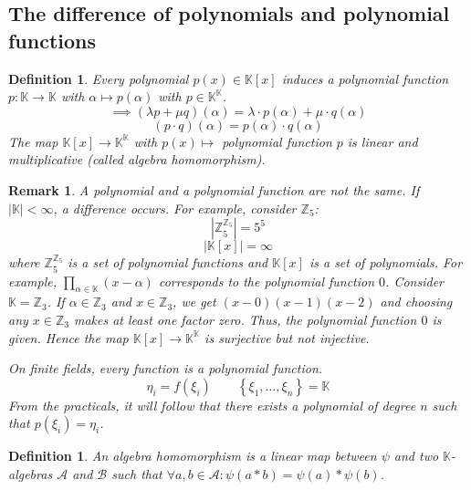 \documentclass{article}
\newcounter{lecref}[section]
\numberwithin{lecref}{section}
\newtheorem{definition}[lecref]{Definition}
\newtheorem{remark}[lecref]{Remark}
\newcommand{\set}[1]{\left\{#1\right\}}
\newcommand{\card}[1]{\left|#1\right|}
\begin{document}
\subsection{The difference of polynomials and polynomial functions}

\begin{definition} %
  Every polynomial $p(x) \in \mathbb K[x]$ induces a polynomial function $p: \mathbb K \to \mathbb K$ with $\alpha \mapsto p(\alpha)$
  with $p \in \mathbb K^{\mathbb K}$.
  \[ \implies (\lambda p + \mu q) (\alpha) = \lambda \cdot p(\alpha) + \mu \cdot q(\alpha) \]
  \[ (p \cdot q)(\alpha) = p(\alpha) \cdot q(\alpha) \]
  The map $\mathbb K[x] \to \mathbb K^{\mathbb K}$ with $p(x) \mapsto$ polynomial function $p$
  is linear and multiplicative (called \emph{algebra homomorphism}).
\end{definition}

\begin{remark} %
  A polynomial and a polynomial function are not the same.
  If $\card{\mathbb K} < \infty$, a difference occurs.
  For example, consider $\mathbb Z_5$:
  \[ \card{\mathbb Z_5^{\mathbb Z_5}} = 5^5 \]
  \[ \card{\mathbb K[x]} = \infty \]
  where $\mathbb Z_5^{\mathbb Z_5}$ is a set of polynomial functions and $\mathbb K[x]$ is a set of polynomials.
  For example, $\prod_{\alpha \in \mathbb K}(x - \alpha)$ corresponds to the polynomial function $0$.
  Consider $\mathbb K = \mathbb Z_3$. If $\alpha \in \mathbb Z_3$ and $x \in \mathbb Z_3$, we get $(x - 0)(x - 1)(x - 2)$
  and choosing any $x \in \mathbb Z_3$ makes at least one factor zero. Thus, the polynomial function $0$ is given.
  Hence the map $\mathbb K[x] \to \mathbb K^{\mathbb K}$ is surjective but not injective.

  On finite fields, every function is a polynomial function.
  \[ \eta_i = f(\xi_i) \qquad \set{\xi_1, \dots, \xi_n} = \mathbb K \]
  From the practicals, it will follow that there exists a polynomial of degree $n$ such that $p(\xi_i) = \eta_i$.
\end{remark}

\begin{definition} %
  An algebra homomorphism is a linear map between $\psi$ and two $\mathbb K$-algebras $\mathcal A$ and $\mathcal B$ such that
  $\forall a,b \in \mathcal A: \psi(a * b) = \psi(a) * \psi(b)$.
\end{definition}
\end{document}
